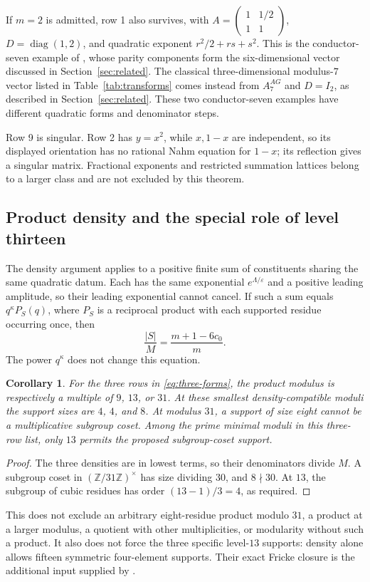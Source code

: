 \documentclass[11pt,reqno]{amsart}
\newtheorem{corollary}[theorem]{Corollary}
\theoremstyle{remark}
\numberwithin{equation}{section}
\newcommand{\ZZ}{\mathbb Z}
\begin{document}
If $m=2$ is admitted, row 1 also survives, with
$A=\left(\begin{smallmatrix}1&1/2\\1&1\end{smallmatrix}\right)$,
$D=\operatorname{diag}(1,2)$, and quadratic exponent
$r^2/2+rs+s^2$. This is the conductor-seven example of
\cite[(42)--(46)]{Mizuno}, whose parity components form the
six-dimensional vector discussed in Section~\ref{sec:related}.
The classical three-dimensional modulus-$7$ vector listed in
Table~\ref{tab:transforms} comes instead from $A_7^{AG}$ and $D=I_2$,
as described in Section~\ref{sec:related}. These two
conductor-seven examples have different quadratic forms and denominator
steps.

Row 9 is singular. Row 2 has $y=x^2$, while $x,1-x$ are independent,
so its displayed orientation has no rational Nahm equation for $1-x$;
its reflection gives a singular matrix. Fractional exponents and
restricted summation lattices belong to a larger class and are not
excluded by this theorem.

\subsection{Product density and the special role of level thirteen}
The density argument applies to a positive finite sum of constituents
sharing the same quadratic datum. Each has the same exponential
$e^{\Lambda/\varepsilon}$ and a positive leading amplitude, so their
leading exponential cannot cancel. If such a sum equals $q^\kappa P_S(q)$,
where $P_S$ is a reciprocal product with each supported residue occurring
once, then
\begin{equation}\label{eq:density-sieve}
 \frac{|S|}{M}=\frac{m+1-6c_0}{m}.
\end{equation}
The power $q^\kappa$ does not change this equation.

\begin{corollary}\label{cor:minimal-coset}
For the three rows in \eqref{eq:three-forms}, the product modulus is
respectively a multiple of $9$, $13$, or $31$. At these smallest
density-compatible moduli the support sizes are $4$, $4$, and $8$.
At modulus $31$, a support of size eight cannot be a multiplicative
subgroup coset. Among the prime minimal moduli in this three-row list,
only $13$ permits the proposed subgroup-coset support.
\end{corollary}
\begin{proof}
The three densities are in lowest terms, so their denominators divide
$M$. A subgroup coset in $(\ZZ/31\ZZ)^\times$ has size dividing $30$,
and $8\nmid30$. At $13$, the subgroup of cubic residues has order
$(13-1)/3=4$, as required.
\end{proof}
This does not exclude an arbitrary eight-residue product modulo $31$,
a product at a larger modulus, a quotient with other multiplicities, or
modularity without such a product. It also does not force the three
specific level-$13$ supports: density alone allows fifteen symmetric
four-element supports. Their exact Fricke closure is the additional
input supplied by \cite[Theorem~1.1]{FrickeCompanion}.
\end{document}
